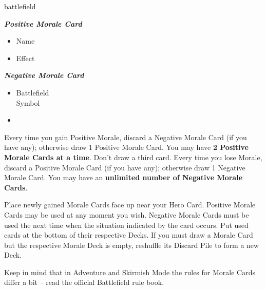 \begin{multicols*}{2}
\begin{expansion}[before=\vspace*{-11mm}]{battlefield}
\vspace{1em}
\begin{scriptsize}
\end{scriptsize}
\vspace{-1em}
\begin{multicols*}{2}
  \centering
  \footnotesize
  \textbf{\textit{\textcolor{darkcandyapplered}{Positive Morale Card}}}
  \vspace{1em}
  \begin{itemize}
    \item[\textbf{1.}] Name
    \item[\textbf{2.}] Effect
  \end{itemize}
  \columnbreak
  \textbf{\textit{\textcolor{darkcandyapplered}{Negative Morale Card}}}
  \begin{itemize}
    \item[\textbf{3.}] Battlefield\\Symbol
    \item[\textbf{\phantom{.}}] \phantom{.}
  \end{itemize}
\end{multicols*}

Every time you gain Positive Morale, discard a Negative Morale Card (if you have any); otherwise draw 1 Positive Morale Card.
You may have \textbf{2 Positive Morale Cards at a time}.
Don't draw a third card.
Every time you lose Morale, discard a Positive Morale Card (if you have any); otherwise draw 1 Negative Morale Card.
You may have an \textbf{unlimited number of Negative Morale Cards}.\par
Place newly gained Morale Cards face up near your Hero Card.
Positive Morale Cards may be used at any moment you wish.
Negative Morale Cards must be used the next time when the situation indicated by the card occurs.
Put used cards at the bottom of their respective Decks.
If you must draw a Morale Card but the respective Morale Deck is empty, reshuffle its Discard Pile to form a new Deck.

Keep in mind that in Adventure and Skirmish Mode the rules for Morale Cards differ a bit -- read the official Battlefield rule book.
\end{expansion}
\end{multicols*}
